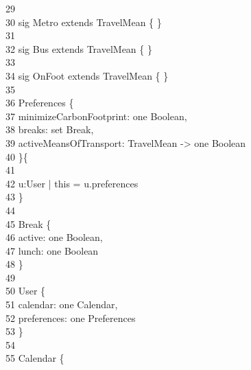 \-    \ 29      \qquad \\
\-    \ 30       {\color{blue}sig} Metro {\color{blue}extends} TravelMean \{ \}\\
\-    \ 31      \qquad \\
\-    \ 32       {\color{blue}sig} Bus {\color{blue}extends} TravelMean \{ \}\\
\-    \ 33      \qquad \\
\-    \ 34       {\color{blue}sig} OnFoot {\color{blue}extends} TravelMean \{ \}\\
\-    \ 35      \qquad \\
\-    \ 36       Preferences \{\\
\-    \ 37      \qquad \-\qquad minimizeCarbonFootprint: {\color{blue}one} Boolean,\\
\-    \ 38      \qquad \-\qquad breaks: {\color{blue}set} Break,\\
\-    \ 39      \qquad \-\qquad activeMeansOfTransport: TravelMean -> {\color{blue}one} Boolean\\
\-    \ 40      \qquad \}\{\\
\-    \ 41      \qquad \-\\
\-    \ 42      \qquad \- u:User | this = u.preferences\\
\-    \ 43      \qquad \}\\
\-    \ 44      \qquad \\
\-    \ 45       Break \{\\
\-    \ 46      \qquad \-\qquad active: {\color{blue}one} Boolean,\\
\-    \ 47      \qquad \-\qquad lunch: {\color{blue}one} Boolean\\
\-    \ 48      \qquad \}\\
\-    \ 49      \qquad \\
\-    \ 50       User \{\\
\-    \ 51      \qquad \-\qquad calendar: {\color{blue}one} Calendar,\\
\-    \ 52      \qquad \-\qquad preferences: {\color{blue}one} Preferences\\
\-    \ 53      \qquad  \}\\
\-    \ 54      \qquad \\
\-    \ 55       Calendar \{\\
